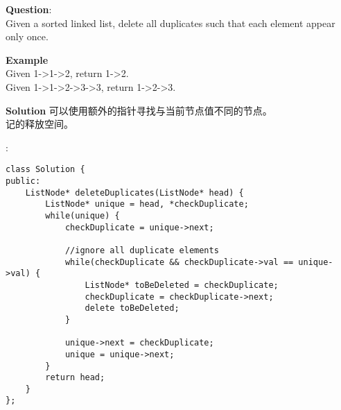     
\begin{description}
    \item{\textbf{Question}}:\\%
		Given a sorted linked list, delete all duplicates such that each element appear only once.

    \item{\textbf{Example}}\\
		Given 1->1->2, return 1->2.\\
		Given 1->1->2->3->3, return 1->2->3.

    \item{\textbf{Solution}}
		可以使用额外的指针寻找与当前节点值不同的节点。\\
		记的释放空间。

	\item{} : \\
		\begin{lstlisting}
class Solution {
public:
    ListNode* deleteDuplicates(ListNode* head) {
		ListNode* unique = head, *checkDuplicate;
		while(unique) {
			checkDuplicate = unique->next;
			
			//ignore all duplicate elements
			while(checkDuplicate && checkDuplicate->val == unique->val) {
				ListNode* toBeDeleted = checkDuplicate;
				checkDuplicate = checkDuplicate->next;
				delete toBeDeleted;
			}

			unique->next = checkDuplicate;
			unique = unique->next;
		}
		return head;
    }
};
		\end{lstlisting}
\end{description}
